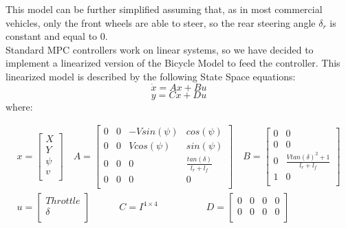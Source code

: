This model can be further simplified assuming that, as in most commercial vehicles, only the front wheels are able to steer, so the rear steering angle $\delta_r$ is constant and equal to 0.\\
Standard MPC controllers work on linear systems, so we have decided to implement a linearized version of the Bicycle Model to feed the controller. This linearized model is described by the following State Space equations:
\begin{equation}
    \label{equation:dynamic1}
    \Dot{x} = Ax + Bu 
\end{equation}
\begin{equation}
    \label{equation:dynamic2}
    y = Cx + Du 
\end{equation}
where:

\begin{equation}
\label{equation:sys_bicycle_kin}
   \begin{aligned}
    x = 
        \begin{bmatrix} %
        X \\ 
        Y \\
        \psi \\
        v \\
        \end{bmatrix}\quad
    A =
        \begin{bmatrix} %
       0 & 0 & -Vsin(\psi) & cos(\psi)\\ 
       0 & 0 & Vcos(\psi) & sin(\psi) \\
       0 & 0 & 0 & \frac{tan(\delta)}{l_r + l_f}\\
       0 & 0 & 0 & 0 \\
        \end{bmatrix}\quad
    B = 
        \begin{bmatrix} %
        0 & 0\\ 
        0 & 0 \\
        0 & \frac{Vtan(\delta)^2 + 1}{l_r + l_f}\\
        1 & 0 \\
        \end{bmatrix}\\[10pt]
    u =
        \begin{bmatrix} %
        Throttle \\
        \delta \\
        \end{bmatrix}\quad\quad\quad
    C = I^{4\times 4}\quad\quad\quad\quad\quad
    D =
        \begin{bmatrix} %
      0 & 0 & 0 & 0\\
      0 & 0 & 0 & 0\\
        \end{bmatrix}
    \end{aligned}
\end{equation} 

